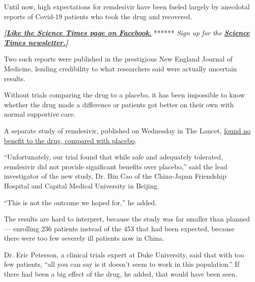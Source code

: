 Until now, high expectations for remdesivir have been fueled largely by
anecdotal reports of Covid-19 patients who took the drug and recovered.

\textbf{\emph{{[}}\href{http://on.fb.me/1paTQ1h}{\emph{Like the Science
Times page on Facebook.}}} ****** \emph{\textbar{} Sign up for the}
\textbf{\href{http://nyti.ms/1MbHaRU}{\emph{Science Times
newsletter.}}\emph{{]}}}

Two such reports were published in the prestigious New England Journal
of Medicine, lending credibility to what researchers said were actually
uncertain results.

Without trials comparing the drug to a placebo, it has been impossible
to know whether the drug made a difference or patients got better on
their own with normal supportive care.

A separate study of remdesivir, published on Wednesday in The Lancet,
\href{https://info.thelancet.com/e2t/c/*W5Lhn838fnW_3W4sm_Wg5QQHzp0/*W5r1Ssg7F8LYhW2vgqZF25s9wN0/5/f18dQhb0Sq5G8XYcl9W7cBCZh2qwv15N4cqMnwqd32pMf5gd4XD6prW7cmS1s8pCQ6vW1mbWlS51fy5BW1mZkg96PZgJcW6253v925_ybHN1fkGplKzm2PN5nYjTX6nKnZVtMd0d4gt1GhW7vVV9F1XJ6fhW57jZ6S8_1Q19W49wcLf2LRNVfW4bJ02h4b_rKwW7MbC3t490HkzVWnFLM4LzjSNW7-XB_567h1CPW8r5GVd2GRw4YW3HtrQn2K4XMjW8tzC3F8q-1tCN1KHWqCRFkK4W5G18Kh3y9KYQW3dgtM73TW-bPW44SfhK8LmYtqW61pGpf2Z_1FDN2_yx0RMHdTrVVyvfc3T_7nPW13211g8zzbM9W8LQbGP8k1lZBW8bCgv05CG9_9W8p-_Z43XZzCFW8fHR_k10p3ZcW8bJghY43Rx5xW17pGy38dQmZsW6wydXJ392FRmW4YxKrk4PxC8jW448k6V2YN1mWW3BYbdm3sfwJ-W41Tj081CSMcvW8mhVQY5GJkvkW1TxRJq25y1NZW65rp9c82Z63tW7m73CJ8rdTqcW7C2cLb7D7HxjW1Dy_KC77gPCSf3S9Pl404}{found
no benefit to the drug, compared with placebo}.

``Unfortunately, our trial found that while safe and adequately
tolerated, remdesivir did not provide significant benefits over
placebo,'' said the lead investigator of the new study, Dr. Bin Cao of
the China-Japan Friendship Hospital and Capital Medical University in
Beijing.

``This is not the outcome we hoped for,'' he added.

The results are hard to interpret, because the study was far smaller
than planned --- enrolling 236 patients instead of the 453 that had been
expected, because there were too few severely ill patients now in China.

Dr. Eric Peterson, a clinical trials expert at Duke University, said
that with too few patients, ``all you can say is it doesn't seem to work
in this population.'' If there had been a big effect of the drug, he
added, that would have been seen.

